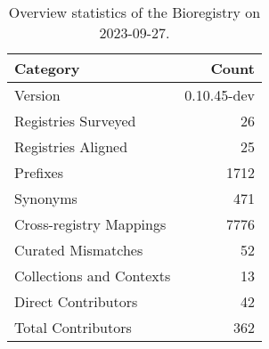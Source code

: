 \begin{table}
\caption{Overview statistics of the Bioregistry on 2023-09-27.}
\label{tab:bioregistry-summary}
\begin{tabular}{lr}
\toprule
Category & Count \\
\midrule
Version & 0.10.45-dev \\
Registries Surveyed & 26 \\
Registries Aligned & 25 \\
Prefixes & 1712 \\
Synonyms & 471 \\
Cross-registry Mappings & 7776 \\
Curated Mismatches & 52 \\
Collections and Contexts & 13 \\
Direct Contributors & 42 \\
Total Contributors & 362 \\
\bottomrule
\end{tabular}
\end{table}
